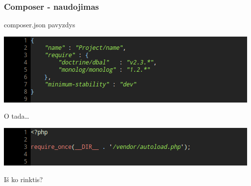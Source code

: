 \documentclass[12pt,a4paper]{beamer}
\begin{document}
\begin{frame}
    \frametitle{Composer - naudojimas}

    composer.json pavyzdys
    \begin{center}
        \includegraphics[scale=0.5]{img/composer_json.png}
    \end{center}
    \pause
    O tada\dots\\
    \begin{center}
        \includegraphics[scale=0.5]{img/autoload.png}
    \end{center}
\end{frame}


\begin{frame}[fragile]

    {\Huge Iš ko rinktis?}
\end{frame}
\end{document}

